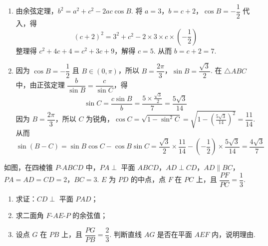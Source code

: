 \begin{solution}
\begin{enumerate}
\item 由余弦定理，\(b^2=a^2+c^2-2ac\cos B\). 将 \(a=3\)，\(b=c+2\)，\(\cos B=-\dfrac12\) 代入，得
\[
(c+2)^2=3^2+c^2-2\times3\times c\times\left(-\frac12\right)
\]
整理得 \(c^2+4c+4=c^2+3c+9\)，解得 \(c=5\). 从而 \(b=c+2=7\).

\item 因为 \(\cos B=-\dfrac12\) 且 \(B\in(0,\pi)\)，所以 \(B=\dfrac{2\pi}{3}\)，\(\sin B=\dfrac{\sqrt3}{2}\).
在 \(\triangle ABC\) 中，由正弦定理 \(\dfrac{b}{\sin B}=\dfrac{c}{\sin C}\)，得
\[
\sin C=\frac{c\sin B}{b}=\frac{5\times\frac{\sqrt3}{2}}{7}=\frac{5\sqrt3}{14}
\]
因为 \(B=\dfrac{2\pi}{3}\)，所以 \(C\) 为锐角，\(\cos C=\sqrt{1-\sin^2C}=\sqrt{1-\left(\frac{5\sqrt3}{14}\right)^2}=\dfrac{11}{14}\).
从而
\[
\sin(B-C)=\sin B\cos C-\cos B\sin C=\frac{\sqrt3}{2}\times\frac{11}{14}-\left(-\frac12\right)\times\frac{5\sqrt3}{14}=\frac{4\sqrt3}{7}
\]
\end{enumerate}
\end{solution}

\begin{problem}
如图，在四棱锥 \(P\)-\(ABCD\) 中，\(PA\perp\) 平面 \(ABCD\)，\(AD\perp CD\)，\(AD\parallel BC\)，\(PA=AD=CD=2\)，\(BC=3\). \(E\) 为 \(PD\) 的中点，点 \(F\) 在 \(PC\) 上，且 \(\dfrac{PF}{PC}=\dfrac13\).

\begin{enumerate}
\item 求证：\(CD\perp\) 平面 \(PAD\)；

\item 求二面角 \(F\)-\(AE\)-\(P\) 的余弦值；

\item 设点 \(G\) 在 \(PB\) 上，且 \(\dfrac{PG}{PB}=\dfrac23\). 判断直线 \(AG\) 是否在平面 \(AEF\) 内，说明理由.
\end{enumerate}

\end{problem}

